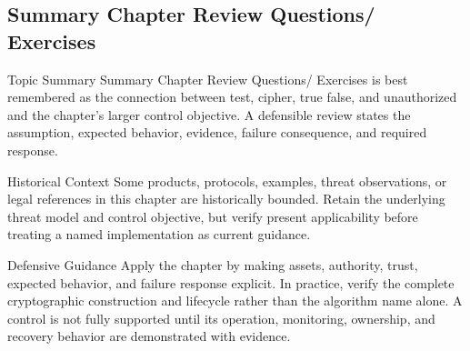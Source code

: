 \documentclass[11pt,letterpaper]{article}
\begin{document}
\subsection*{Summary Chapter Review Questions/ Exercises}
\begin{CornellNotesTable}
\end{CornellNotesTable}
\begin{CornellSummaryBox}{Topic Summary}
Summary Chapter Review Questions/ Exercises is best remembered as the connection between test, cipher, true false, and unauthorized and the chapter's larger control objective. A defensible review states the assumption, expected behavior, evidence, failure consequence, and required response.
\end{CornellSummaryBox}
\begin{CornellWarningBox}{Historical Context}
Some products, protocols, examples, threat observations, or legal references in this chapter are historically bounded. Retain the underlying threat model and control objective, but verify present applicability before treating a named implementation as current guidance.
\end{CornellWarningBox}
\begin{CornellOverviewBox}{Defensive Guidance}
Apply the chapter by making assets, authority, trust, expected behavior, and failure response explicit. In practice, verify the complete cryptographic construction and lifecycle rather than the algorithm name alone. A control is not fully supported until its operation, monitoring, ownership, and recovery behavior are demonstrated with evidence.
\end{CornellOverviewBox}
\end{document}
